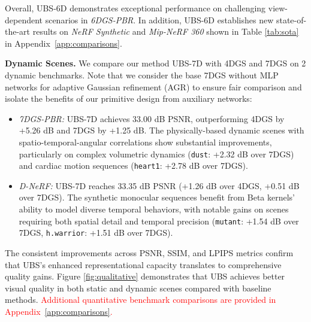 \documentclass{article} %
\begin{document}
Overall, UBS-6D demonstrates exceptional performance on challenging view-dependent scenarios in \textit{6DGS-PBR}. In addition, UBS-6D establishes new state-of-the-art results on \textit{NeRF Synthetic} and \textit{Mip-NeRF 360} shown in Table \ref{tab:sota} in Appendix~\ref{app:comparisons}.

\textbf{Dynamic Scenes.} We compare our method UBS-7D with 4DGS and 7DGS on 2 dynamic benchmarks. Note that we consider the base 7DGS without MLP networks for adaptive Gaussian refinement (AGR) to ensure fair comparison and isolate the benefits of our primitive design from auxiliary networks:

\begin{itemize}[left=0pt, labelsep=0.5em, noitemsep, topsep=0pt, partopsep=0pt, parsep=0pt]
\item \textit{7DGS-PBR:} UBS-7D achieves 33.00 dB PSNR, outperforming 4DGS by +5.26 dB and 7DGS by +1.25 dB. The physically-based dynamic scenes with spatio-temporal-angular correlations show substantial improvements, particularly on complex volumetric dynamics (\texttt{dust}: +2.32 dB over 7DGS) and cardiac motion sequences (\texttt{heart1}: +2.78 dB over 7DGS).

\item \textit{D-NeRF:} UBS-7D reaches 33.35 dB PSNR (+1.26 dB over 4DGS, +0.51 dB over 7DGS). The synthetic monocular sequences benefit from Beta kernels' ability to model diverse temporal behaviors, with notable gains on scenes requiring both spatial detail and temporal precision (\texttt{mutant}: +1.54 dB over 7DGS, \texttt{h.warrior}: +1.51 dB over 7DGS).
\end{itemize}

The consistent improvements across PSNR, SSIM, and LPIPS metrics confirm that UBS's enhanced representational capacity translates to comprehensive quality gains. Figure \ref{fig:qualitative} demonstrates that UBS achieves better visual quality in both static and dynamic scenes compared with baseline methods. \textcolor{red}{Additional quantitative benchmark comparisons are provided in Appendix~\ref{app:comparisons}.}
\end{document}
